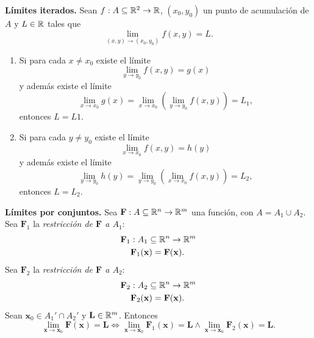 \begin{propertie}\textbf{L\'imites iterados.} \label{prop:lim_ite}
  Sean $f: A  \subseteq  \mathbb{R}^2 \to \mathbb{R}$, $(x_0,y_0)$ un punto de acumulaci\'on de $A$ y $L \in \mathbb{R}$ tales que
  \[
   \lim_{(x,y) \to (x_0,y_0)} f(x,y) = L.
  \]
  \begin{enumerate} %
   \item Si para cada $x \ne x_0$ existe el l\'imite
  \[
   \lim_{y \to y_0} f(x,y) = g(x)
  \]
  y adem\'as existe el l\'imite
  \[
   \lim_{x \to x_0} g(x) = \lim_{x \to x_0} \left( \lim_{y \to y_0} f(x,y) \right) = L_1,
  \]  
  entonces $L = L1$.
  \item Si para cada $y \ne y_0$ existe el l\'imite
  \[
   \lim_{x \to x_0} f(x,y) = h(y)
  \]
  y adem\'as existe el l\'imite
  \[
   \lim_{y \to y_0} h(y) = \lim_{y \to y_0} \left( \lim_{x \to x_0} f(x,y) \right) = L_2, 
  \]
  entonces $L = L_2$.
  \end{enumerate}
\end{propertie}

\begin{propertie}\textbf{L\'imites por conjuntos.} \label{prop:lim_x_conj}
   Sea $\mathbf{F} : A  \subseteq  \mathbb{R}^n \to \mathbb{R}^m$ una funci\'on, con $A = A_1 \cup A_2$.\\
   Sea $\mathbf{F}_1$ la \emph{restricci\'on de $\mathbf{F}$ a $A_1$}:
 \begin{align*}
  \mathbf{F}_1 &: A_1  \subseteq  \mathbb{R}^n \to \mathbb{R}^m \\
  &\mathbf{F}_1(\mathbf{x}) = \mathbf{F}(\mathbf{x}).
 \end{align*}
Sea $\mathbf{F}_2$ la \emph{restricci\'on de $\mathbf{F}$ a $A_2$}:
 \begin{align*}
  \mathbf{F}_2 &: A_2  \subseteq  \mathbb{R}^n \to \mathbb{R}^m \\
  &\mathbf{F}_2(\mathbf{x}) = \mathbf{F}(\mathbf{x}).
 \end{align*}
 Sean $\mathbf{x}_0 \in A_1' \cap A_2'$ y $\mathbf{L} \in \mathbb{R}^m$. Entonces
 \[
  \lim_{\mathbf{x} \to \mathbf{x}_0} \mathbf{F}(\mathbf{x}) = \mathbf{L} \iff 
  \lim_{\mathbf{x} \to \mathbf{x}_0} \mathbf{F}_1(\mathbf{x}) = \mathbf{L} \wedge \lim_{\mathbf{x} \to \mathbf{x}_0} \mathbf{F}_2(\mathbf{x}) = \mathbf{L}.
 \]
\end{propertie}



